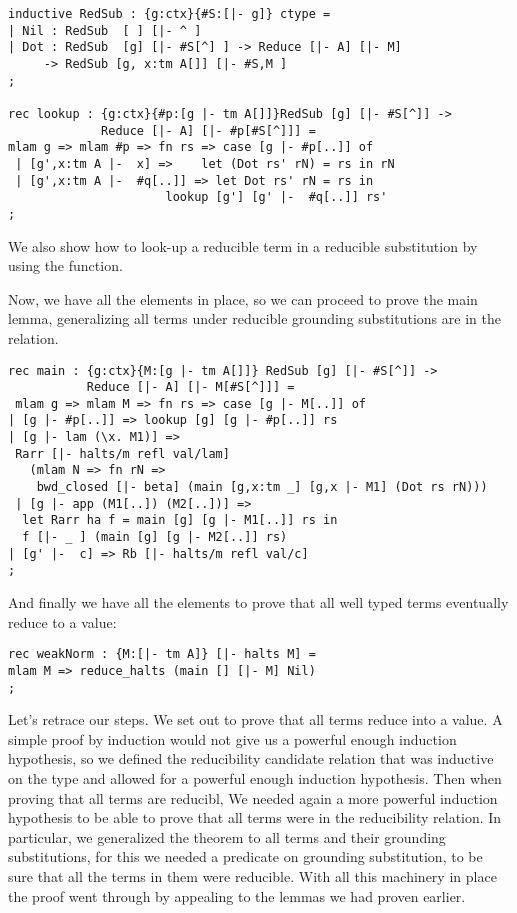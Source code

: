 \begin{lstlisting}
inductive RedSub : {g:ctx}{#S:[|- g]} ctype =
| Nil : RedSub  [ ] [|- ^ ]
| Dot : RedSub  [g] [|- #S[^] ] -> Reduce [|- A] [|- M]
     -> RedSub [g, x:tm A[]] [|- #S,M ]
;

rec lookup : {g:ctx}{#p:[g |- tm A[]]}RedSub [g] [|- #S[^]] ->
             Reduce [|- A] [|- #p[#S[^]]] =
mlam g => mlam #p => fn rs => case [g |- #p[..]] of
 | [g',x:tm A |-  x] =>    let (Dot rs' rN) = rs in rN
 | [g',x:tm A |-  #q[..]] => let Dot rs' rN = rs in
                      lookup [g'] [g' |-  #q[..]] rs'
;
\end{lstlisting}

We also show how to look-up a reducible term in a reducible
substitution by using the  function.

Now, we have all the elements in place, so we can proceed to prove the
main lemma, generalizing all terms under reducible grounding substitutions are
in the  relation.
\begin{lstlisting}
rec main : {g:ctx}{M:[g |- tm A[]]} RedSub [g] [|- #S[^]] ->
           Reduce [|- A] [|- M[#S[^]]] =
 mlam g => mlam M => fn rs => case [g |- M[..]] of
| [g |- #p[..]] => lookup [g] [g |- #p[..]] rs
| [g |- lam (\x. M1)] =>
 Rarr [|- halts/m refl val/lam]
   (mlam N => fn rN =>
    bwd_closed [|- beta] (main [g,x:tm _] [g,x |- M1] (Dot rs rN)))
 | [g |- app (M1[..]) (M2[..])] =>
  let Rarr ha f = main [g] [g |- M1[..]] rs in
  f [|- _ ] (main [g] [g |- M2[..]] rs)
| [g' |-  c] => Rb [|- halts/m refl val/c]
;
\end{lstlisting}

And finally we have all the elements to prove that all well typed
terms eventually reduce to a value:
\begin{lstlisting}
rec weakNorm : {M:[|- tm A]} [|- halts M] =
mlam M => reduce_halts (main [] [|- M] Nil)
;
\end{lstlisting}

Let's retrace our steps. We set out to prove that all terms reduce into a
value. A simple proof by induction would not give us a powerful enough
induction hypothesis, so we defined the reducibility candidate
relation that was inductive on the type and allowed for a powerful enough
induction hypothesis. Then when proving that all terms are reducibl, We needed again a more powerful induction
hypothesis to be able to prove that all terms were in the reducibility
relation. In particular, we generalized the theorem to all terms and
their grounding substitutions, for this we needed a predicate on
grounding substitution, to be sure that all the terms in them were
reducible. With all this machinery in place the proof went through by
appealing to the lemmas we had proven earlier.

